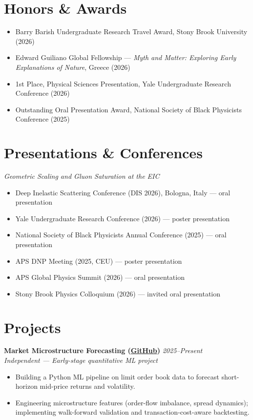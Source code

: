 \documentclass[11pt,letterpaper]{article}
\newcommand{\lineitem}[2]{%
  \textbf{#1} \hfill \textit{#2}\\[-2pt]
}
\newcommand{\subheader}[1]{\textit{#1}\\[2pt]}
\newcommand{\cvitem}[1]{\item #1}
\begin{document}
\section{Honors \& Awards}
\begin{itemize}[leftmargin=*, nosep, topsep=2pt]
  \cvitem{Barry Barish Undergraduate Research Travel Award, Stony Brook University (2026)}
  \cvitem{Edward Guiliano Global Fellowship --- \textit{Myth and Matter: Exploring Early Explanations of Nature}, Greece (2026)}
  \cvitem{1st Place, Physical Sciences Presentation, Yale Undergraduate Research Conference (2026)}
  \cvitem{Outstanding Oral Presentation Award, National Society of Black Physicists Conference (2025)}
\end{itemize}

\section{Presentations \& Conferences}
\textit{Geometric Scaling and Gluon Saturation at the EIC}
\begin{itemize}[leftmargin=*, nosep, topsep=2pt]
  \cvitem{Deep Inelastic Scattering Conference (DIS 2026), Bologna, Italy --- oral presentation}
  \cvitem{Yale Undergraduate Research Conference (2026) --- poster presentation}
  \cvitem{National Society of Black Physicists Annual Conference (2025) --- oral presentation}
  \cvitem{APS DNP Meeting (2025, CEU) --- poster presentation}
  \cvitem{APS Global Physics Summit (2026) --- oral presentation}
  \cvitem{Stony Brook Physics Colloquium (2026) --- invited oral presentation}
\end{itemize}

\section{Projects}

\lineitem{Market Microstructure Forecasting (\href{https://github.com/iRojae/market-microstructure-forecasting}{GitHub})}{2025--Present}
\subheader{Independent --- Early-stage quantitative ML project}
\begin{itemize}[leftmargin=*, nosep, topsep=2pt]
  \cvitem{Building a Python ML pipeline on limit order book data to forecast short-horizon mid-price returns and volatility.}
  \cvitem{Engineering microstructure features (order-flow imbalance, spread dynamics); implementing walk-forward validation and transaction-cost-aware backtesting.}
\end{itemize}
\end{document}
